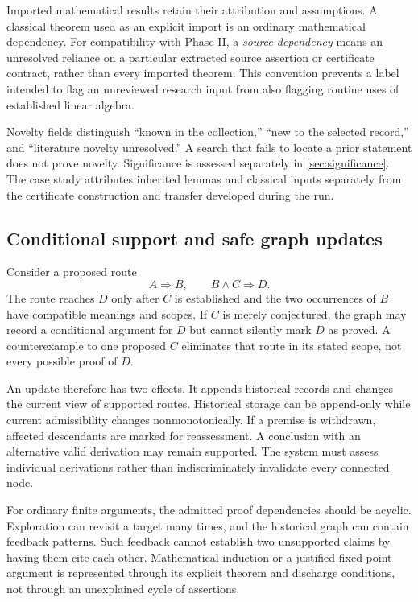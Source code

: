 Imported mathematical results retain their attribution and assumptions. A classical theorem used as an explicit import is an ordinary mathematical dependency. For compatibility with Phase II, a \emph{source dependency} means an unresolved reliance on a particular extracted source assertion or certificate contract, rather than every imported theorem. This convention prevents a label intended to flag an unreviewed research input from also flagging routine uses of established linear algebra.

Novelty fields distinguish ``known in the collection,'' ``new to the selected record,'' and ``literature novelty unresolved.'' A search that fails to locate a prior statement does not prove novelty. Significance is assessed separately in \cref{sec:significance}. The case study attributes inherited lemmas and classical inputs separately from the certificate construction and transfer developed during the run.

\subsection{Conditional support and safe graph updates}

Consider a proposed route
\[
 A\Longrightarrow B,\qquad B\land C\Longrightarrow D.
\]
The route reaches $D$ only after $C$ is established and the two occurrences of $B$ have compatible meanings and scopes. If $C$ is merely conjectured, the graph may record a conditional argument for $D$ but cannot silently mark $D$ as proved. A counterexample to one proposed $C$ eliminates that route in its stated scope, not every possible proof of $D$.

An update therefore has two effects. It appends historical records and changes the current view of supported routes. Historical storage can be append-only while current admissibility changes nonmonotonically. If a premise is withdrawn, affected descendants are marked for reassessment. A conclusion with an alternative valid derivation may remain supported. The system must assess individual derivations rather than indiscriminately invalidate every connected node.

For ordinary finite arguments, the admitted proof dependencies should be acyclic. Exploration can revisit a target many times, and the historical graph can contain feedback patterns. Such feedback cannot establish two unsupported claims by having them cite each other. Mathematical induction or a justified fixed-point argument is represented through its explicit theorem and discharge conditions, not through an unexplained cycle of assertions.

